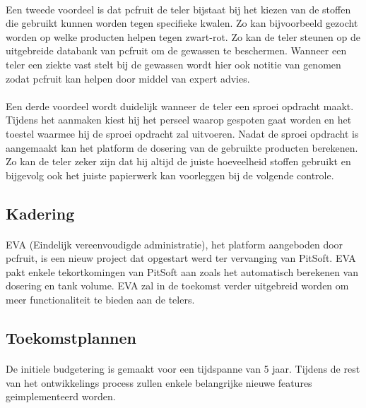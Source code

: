 \paragraph {} Een tweede voordeel is dat pcfruit de teler bijstaat bij het kiezen van de
stoffen die gebruikt kunnen worden tegen specifieke kwalen. Zo kan bijvoorbeeld gezocht
worden op welke producten helpen tegen zwart-rot. Zo kan de teler steunen op de
uitgebreide databank van pcfruit om de gewassen te beschermen. Wanneer een teler een
ziekte vast stelt bij de gewassen wordt hier ook notitie van genomen zodat pcfruit kan
helpen door middel van expert advies.

\paragraph {} Een derde voordeel wordt duidelijk wanneer de teler een sproei opdracht
maakt. Tijdens het aanmaken kiest hij het perseel waarop gespoten gaat worden en het
toestel waarmee hij de sproei opdracht zal uitvoeren. Nadat de sproei opdracht is
aangemaakt kan het platform de dosering van de gebruikte producten berekenen. Zo kan de
teler zeker zijn dat hij altijd de juiste hoeveelheid stoffen gebruikt en bijgevolg ook
het juiste papierwerk kan voorleggen bij de volgende controle.


\subsection {Kadering}

\paragraph {} EVA (Eindelijk vereenvoudigde administratie), het platform aangeboden door
pcfruit, is een nieuw project dat opgestart werd ter vervanging van PitSoft. EVA pakt
enkele tekortkomingen van PitSoft aan zoals het automatisch berekenen van dosering en tank
volume. EVA zal in de toekomst verder uitgebreid worden om meer functionaliteit te bieden
aan de telers.

\subsection {Toekomstplannen}

\paragraph {} De initiele budgetering is gemaakt voor een tijdspanne van 5 jaar. Tijdens de rest van
het ontwikkelings process zullen enkele belangrijke nieuwe features geimplementeerd
worden.

